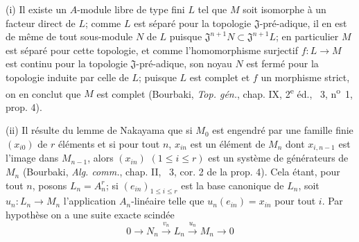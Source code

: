(i) Il existe un $A$-module libre de type fini $L$ tel que $M$ soit isomorphe à un facteur direct de $L$; comme $L$ est séparé pour la topologie $\mathfrak J$-pré-adique, il en est de même de tout sous-module $N$ de $L$ puisque $\mathfrak J^{n+1}N\subset\mathfrak J^{n+1}L$; en particulier $M$ est séparé pour cette topologie, et comme l'homomorphisme surjectif $f:L\to M$ est continu pour la topologie $\mathfrak J$-pré-adique, son noyau $N$ est fermé pour la topologie induite par celle de $L$; puisque $L$ est complet et $f$ un morphisme strict, on en conclut que $M$ est complet (Bourbaki, \emph{Top. gén.}, chap. IX, 2\textsuperscript{e} éd., \textsection~3, n\textsuperscript{o}~1, prop. 4).

(ii) Il résulte du lemme de Nakayama que si $M_0$ est engendré par une famille finie $(x_{i0})$ de $r$ éléments et si pour tout $n$, $x_{in}$ est un élément de $M_n$ dont $x_{i,n-1}$ est l'image dans $M_{n-1}$, alors $(x_{in})$ $(1\leq i\leq r)$ est un système de générateurs de $M_n$ (Bourbaki, \emph{Alg. comm.}, chap. II, \textsection~3, cor. 2 de la prop. 4). Cela étant, pour tout $n$, posons $L_n=A_n^r$; si $(e_{in})_{1\leq i\leq r}$ est la base canonique de $L_n$, soit $u_n:L_n\to M_n$ l'application $A_n$-linéaire telle que $u_n(e_{in})=x_{in}$ pour tout $i$. Par hypothèse on a une suite exacte scindée
\[
  0\longrightarrow N_n\xrightarrow{v_n}L_n\xrightarrow{u_n}M_n\longrightarrow 0
\]

